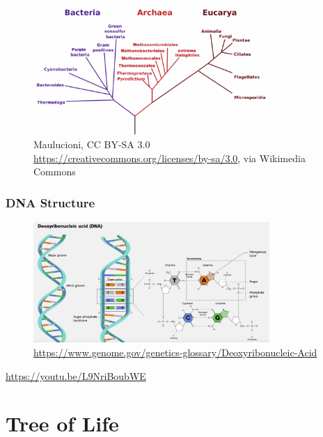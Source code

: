\documentclass[
]{book}
\begin{document}
\begin{figure}
\centering
\includegraphics[width=0.8\textwidth,height=\textheight]{./Figures/Woese1.png}
\caption{Maulucioni, CC BY-SA 3.0 \url{https://creativecommons.org/licenses/by-sa/3.0}, via Wikimedia Commons}
\end{figure}

\hypertarget{dna-structure}{%
\subsubsection*{DNA Structure}\label{dna-structure}}

\begin{figure}
\centering
\includegraphics[width=0.8\textwidth,height=\textheight]{./Figures/DNA.png}
\caption{\url{https://www.genome.gov/genetics-glossary/Deoxyribonucleic-Acid}}
\end{figure}

\url{https://youtu.be/L9NriBoubWE}

\hypertarget{tree-of-life}{%
\section{Tree of Life}\label{tree-of-life}}
\end{document}
